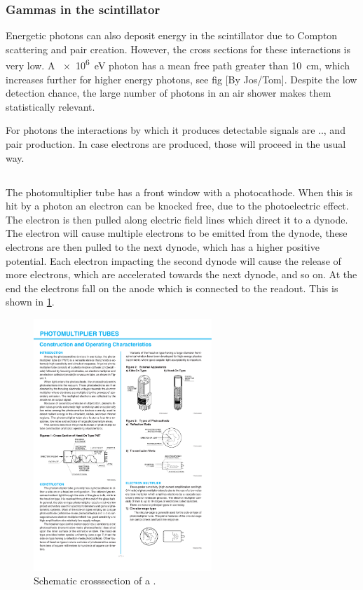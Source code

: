 \subsubsection{Gammas in the scintillator}

Energetic photons can also deposit energy in the scintillator due to Compton scattering and pair creation. However, the cross sections for these interactions is very low. A \SI{e6}{\eV} photon  has a mean free path greater than \SI{10}{\centi\meter}, which increases further for higher energy photons, see fig [By Jos/Tom]. Despite the low detection chance, the large number of photons in an air shower makes them statistically relevant.

For photons the interactions by which it produces detectable signals are .., and pair production. In case electrons are produced, those will proceed in the usual way.


\subsection{\pmt}

The photomultiplier tube has a front window with a photocathode. When this is hit by a photon an electron can be knocked free, due to the photoelectric effect. The electron is then pulled along electric field lines which direct it to a dynode. The electron will cause multiple electrons to be emitted from the dynode, these electrons are then pulled to the next dynode, which has a higher positive potential. Each electron impacting the second dynode will cause the release of more electrons, which are accelerated towards the next dynode, and so on. At the end the electrons fall on the anode which is connected to the readout. This is shown in \cref{fig:pmt_schematic}.

\begin{figure}
    \centering
    \includegraphics[width=0.6\textwidth]
                    {plots/experiment/pmt_schematic}
    \caption{Schematic crosssection of a \pmt.}
    \label{fig:pmt_schematic}
\end{figure}

